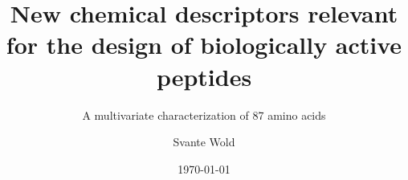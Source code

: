 \author{Svante Wold}

\title{New chemical descriptors relevant for the design of biologically active peptides}
\subtitle{A multivariate characterization of 87 amino acids}
\date{\today}

\maketitle


